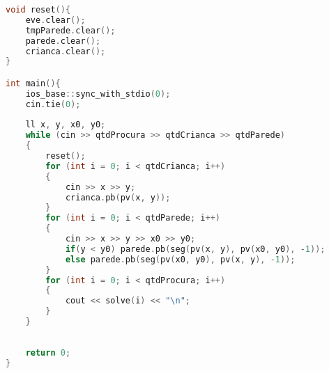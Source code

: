 \documentclass[12pt,a4paper, twoside]{report}
\begin{document}
\begin{lstlisting}[caption=Sweep Circle (esconde-esconde),language=C++]
void reset(){
    eve.clear();
    tmpParede.clear();
    parede.clear();
    crianca.clear();
}

int main(){
    ios_base::sync_with_stdio(0);
    cin.tie(0);
    
    ll x, y, x0, y0;
    while (cin >> qtdProcura >> qtdCrianca >> qtdParede)
    {
        reset();
        for (int i = 0; i < qtdCrianca; i++)
        {
            cin >> x >> y;
            crianca.pb(pv(x, y));
        }
        for (int i = 0; i < qtdParede; i++)
        {
            cin >> x >> y >> x0 >> y0;
            if(y < y0) parede.pb(seg(pv(x, y), pv(x0, y0), -1));
            else parede.pb(seg(pv(x0, y0), pv(x, y), -1));
        }
        for (int i = 0; i < qtdProcura; i++)
        {
            cout << solve(i) << "\n";
        }
    }
    
    
    return 0;
}

\end{lstlisting}
\end{document}
